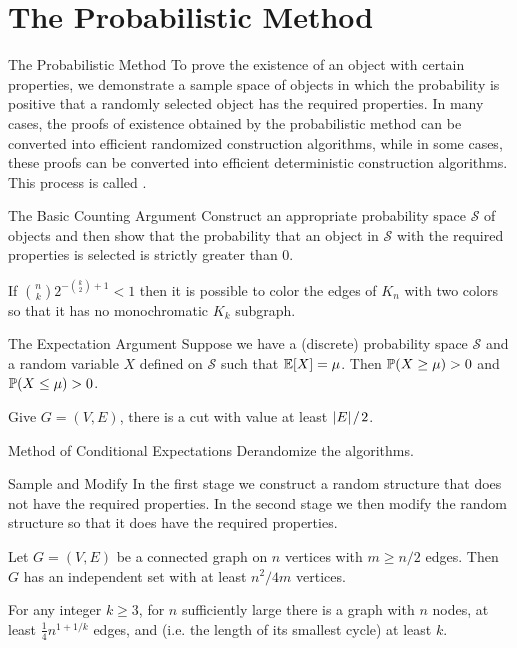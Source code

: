 \documentclass[main.tex]{subfiles}
\begin{document}
\minispacing

\section{The Probabilistic Method}

{\bs The Probabilistic Method} To prove the existence of an object with certain properties, we demonstrate a sample space of objects in which the probability is positive that a randomly selected object has the required properties. In many cases, the proofs of existence obtained by the probabilistic method can be converted into efficient randomized construction algorithms, while in some cases, these proofs can be converted into efficient deterministic construction algorithms. This process is called .

{\bs The Basic Counting Argument} Construct an appropriate probability space $\mathcal{S}$ of objects and then show that the probability that an object in $\mathcal{S}$ with the required properties is selected is strictly greater than $0$.

\begin{theorem}
    If $\binom n k 2^{-\binom k 2 + 1} < 1$ then it is possible to color the edges of $K_n$ with two colors so that it has no monochromatic $K_k$ subgraph.
\end{theorem}

{\bs The Expectation Argument} Suppose we have a (discrete) probability space $\mathcal{S}$ and a random variable $X$ defined on $\mathcal{S}$ such that $\mathbb{E}[X]=\mu$. Then $\mathbb{P}(X\ge \mu) >0$ and $\mathbb{P}(X\le \mu)>0$.

\begin{theorem}
    Give $G=(V,E)$, there is a cut with value at least $|E|\;\!/\;\! 2$.
\end{theorem}

{\bs Method of Conditional Expectations} Derandomize the algorithms.

{\bs Sample and Modify} In the first stage we construct a random structure that does not have the required properties. In the second stage we then modify the random structure so that it does have the required properties.

\begin{theorem}
    Let $G=(V,E)$ be a connected graph on $n$ vertices with $m\ge n/2$ edges. Then $G$ has an independent set with at least $n^2/4m$ vertices.
\end{theorem}

\begin{theorem}
    For any integer $k\ge 3$, for $n$ sufficiently large there is a graph with $n$ nodes, at least $\frac{1}{4}n^{1+1/k}$ edges, and  (i.e. the length of its smallest cycle) at least $k$.
\end{theorem}
\end{document}
